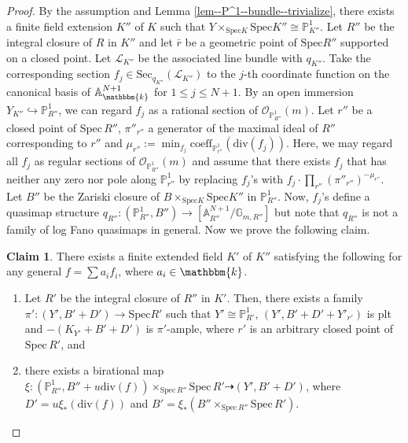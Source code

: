 \documentclass[12pt,twoside]{amsart}
\theoremstyle{definition}
\newtheorem*{claim*}{Claim}
\begin{document}
\begin{proof}
    By the assumption and Lemma \ref{lem--P^1--bundle--trivialize}, there exists a
   finite field extension $K''$ of $K$ such that $Y\times_{\mathrm{Spec}K}\mathrm{Spec}K''\cong\mathbb{P}^1_{K''}$. 
    Let $R''$ be the integral closure of $R$ in $K''$ and let $\bar{r}$ be a geometric point of $\mathrm{Spec} R''$ supported on a closed point.
    Let $\mathscr{L}_{K''}$ be the associated line bundle with $q_{K''}$.
    Take the corresponding section $f_j\in\mathrm{Sec}_{q_{K''}}(\mathscr{L}_{K''})$ to the $j$-th coordinate function on the canonical basis of $\mathbb{A}_{\mathbbm{k}}^{N+1}$ for $1\le j\le N+1$.
    By an open immersion $Y_{K''}\hookrightarrow\mathbb{P}^1_{R''}$, we can regard $f_j$ as a rational section of $\mathcal{O}_{\mathbb{P}^1_{R''}}(m)$.
    Let $r''$ be a closed point of $\mathrm{Spec}\,R''$, $\pi''_{r''}$ a generator of the maximal ideal of $R''$ corresponding to $r''$ and $\mu_{r''}:=\min_{f_j}\mathrm{coeff}_{\mathbb{P}^1_{r''}}(\mathrm{div}(f_j))$.
    Here, we may regard all $f_j$ as regular sections of $\mathcal{O}_{\mathbb{P}^1_{R''}}(m)$ and assume that there exists $f_j$ that has neither any zero nor pole along $\mathbb{P}^1_{r''}$ by replacing $f_j$'s with $f_j\cdot\prod_{r''}(\pi''_{r''})^{-\mu_{r''}}$.
    Let $B''$ be the Zariski closure of $B\times_{\mathrm{Spec}K}\mathrm{Spec}K''$ in $\mathbb{P}^1_{R''}$.
    Now, $f_j$'s define a quasimap structure $q_{R''}\colon(\mathbb{P}^1_{R''},B'')\to[\mathbb{A}^{N+1}_{R''}/\mathbb{G}_{m,R''}]$ but note that $q_{R''}$ is not a family of log Fano quasimaps in general.    
    Now we prove the following claim.
    \begin{claim*}
\label{claim--1}    There exists a finite extended field $K'$ of $K''$ satisfying the following for any general $f=\sum a_if_i$, where $a_i\in\mathbbm{k}$. 
\begin{enumerate}
    \item Let $R'$ be the integral closure of $R''$ in $K'$. Then, there exists a family $\pi'\colon (Y',B'+D')\to \mathrm{Spec}R'$ such that $Y'\cong\mathbb{P}^1_{R'}$, $(Y',B'+D'+Y'_{r'})$ is plt and $-(K_{Y'}+B'+D')$ is $\pi'$-ample, where $r'$ is an arbitrary closed point of $\mathrm{Spec}\,R'$, and
    \item there exists a birational map $\xi\colon(\mathbb{P}^1_{R''},B''+u\mathrm{div}(f))\times_{\mathrm{Spec}\,R''}\mathrm{Spec}\,R' \dashrightarrow (Y',B'+D')$, where $D'=u\xi_*(\mathrm{div}(f))$ and $B'=\xi_*(B''\times_{\mathrm{Spec}\,R''}\mathrm{Spec}\,R')$.
\end{enumerate}

\end{claim*}
\end{proof}
\end{document}
